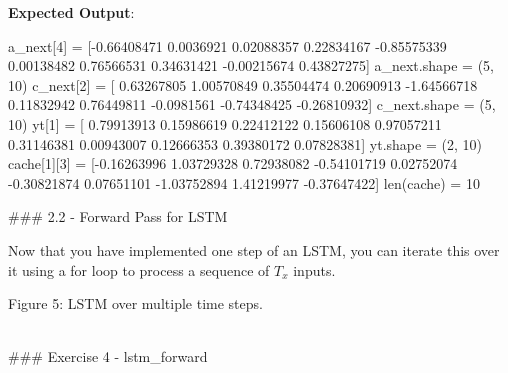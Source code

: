 \documentclass[11pt]{article}
\newenvironment{Shaded}{}{}
\newcommand{\DecValTok}[1]{\textcolor[rgb]{0.25,0.63,0.44}{{#1}}}
\newcommand{\FloatTok}[1]{\textcolor[rgb]{0.25,0.63,0.44}{{#1}}}
\newcommand{\NormalTok}[1]{{#1}}
\newcommand{\OperatorTok}[1]{\textcolor[rgb]{0.40,0.40,0.40}{{#1}}}
\newcommand{\BuiltInTok}[1]{{#1}}
\begin{document}
    \textbf{Expected Output}:

\begin{Shaded}
\begin{Highlighting}[]
\NormalTok{a\_next[}\DecValTok{4}\NormalTok{] }\OperatorTok{=} 
\NormalTok{ [}\OperatorTok{{-}}\FloatTok{0.66408471}  \FloatTok{0.0036921}   \FloatTok{0.02088357}  \FloatTok{0.22834167} \OperatorTok{{-}}\FloatTok{0.85575339}  \FloatTok{0.00138482}
  \FloatTok{0.76566531}  \FloatTok{0.34631421} \OperatorTok{{-}}\FloatTok{0.00215674}  \FloatTok{0.43827275}\NormalTok{]}
\NormalTok{a\_next.shape }\OperatorTok{=}\NormalTok{  (}\DecValTok{5}\NormalTok{, }\DecValTok{10}\NormalTok{)}
\NormalTok{c\_next[}\DecValTok{2}\NormalTok{] }\OperatorTok{=} 
\NormalTok{ [ }\FloatTok{0.63267805}  \FloatTok{1.00570849}  \FloatTok{0.35504474}  \FloatTok{0.20690913} \OperatorTok{{-}}\FloatTok{1.64566718}  \FloatTok{0.11832942}
  \FloatTok{0.76449811} \OperatorTok{{-}}\FloatTok{0.0981561}  \OperatorTok{{-}}\FloatTok{0.74348425} \OperatorTok{{-}}\FloatTok{0.26810932}\NormalTok{]}
\NormalTok{c\_next.shape }\OperatorTok{=}\NormalTok{  (}\DecValTok{5}\NormalTok{, }\DecValTok{10}\NormalTok{)}
\NormalTok{yt[}\DecValTok{1}\NormalTok{] }\OperatorTok{=}\NormalTok{ [ }\FloatTok{0.79913913}  \FloatTok{0.15986619}  \FloatTok{0.22412122}  \FloatTok{0.15606108}  \FloatTok{0.97057211}  \FloatTok{0.31146381}
  \FloatTok{0.00943007}  \FloatTok{0.12666353}  \FloatTok{0.39380172}  \FloatTok{0.07828381}\NormalTok{]}
\NormalTok{yt.shape }\OperatorTok{=}\NormalTok{  (}\DecValTok{2}\NormalTok{, }\DecValTok{10}\NormalTok{)}
\NormalTok{cache[}\DecValTok{1}\NormalTok{][}\DecValTok{3}\NormalTok{] }\OperatorTok{=}
\NormalTok{ [}\OperatorTok{{-}}\FloatTok{0.16263996}  \FloatTok{1.03729328}  \FloatTok{0.72938082} \OperatorTok{{-}}\FloatTok{0.54101719}  \FloatTok{0.02752074} \OperatorTok{{-}}\FloatTok{0.30821874}
  \FloatTok{0.07651101} \OperatorTok{{-}}\FloatTok{1.03752894}  \FloatTok{1.41219977} \OperatorTok{{-}}\FloatTok{0.37647422}\NormalTok{]}
\BuiltInTok{len}\NormalTok{(cache) }\OperatorTok{=}  \DecValTok{10}
\end{Highlighting}
\end{Shaded}

    \#\#\# 2.2 - Forward Pass for LSTM

Now that you have implemented one step of an LSTM, you can iterate this
over it using a for loop to process a sequence of \(T_x\) inputs.

Figure 5: LSTM over multiple time steps.

~\\
\#\#\# Exercise 4 - lstm\_forward
\end{document}
